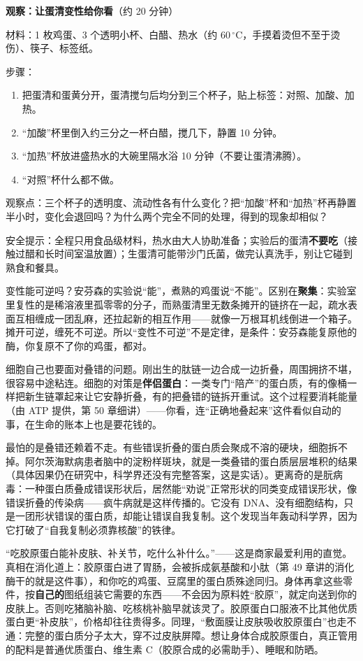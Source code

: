 \begin{shiyan}
\textbf{观察：让蛋清变性给你看}（约 20 分钟）

材料：1 枚鸡蛋、3 个透明小杯、白醋、热水（约 $60\,^{\circ}\mathrm{C}$，手摸着烫但不至于烫伤）、筷子、标签纸。

步骤：
\begin{enumerate}[itemsep=1pt]
\item 把蛋清和蛋黄分开，蛋清搅匀后均分到三个杯子，贴上标签：对照、加酸、加热。
\item “加酸”杯里倒入约三分之一杯白醋，搅几下，静置 10 分钟。
\item “加热”杯放进盛热水的大碗里隔水浴 10 分钟（不要让蛋清沸腾）。
\item “对照”杯什么都不做。
\end{enumerate}

观察点：三个杯子的透明度、流动性各有什么变化？把“加酸”杯和“加热”杯再静置半小时，变化会退回吗？为什么两个完全不同的处理，得到的现象却相似？

安全提示：全程只用食品级材料，热水由大人协助准备；实验后的蛋清\textbf{不要吃}（接触过醋和长时间室温放置）；生蛋清可能带沙门氏菌，做完认真洗手，别让它碰到熟食和餐具。
\end{shiyan}

变性能可逆吗？安芬森的实验说“能”，煮熟的鸡蛋说“不能”。区别在\textbf{聚集}：实验室里复性的是稀溶液里孤零零的分子，而熟蛋清里无数条摊开的链挤在一起，疏水表面互相缠成一团乱麻，还拉起新的相互作用——就像一万根耳机线倒进一个箱子。摊开可逆，缠死不可逆。所以“变性不可逆”不是定律，是条件：安芬森能复原他的酶，你复原不了你的鸡蛋，都对。

细胞自己也要面对叠错的问题。刚出生的肽链一边合成一边折叠，周围拥挤不堪，很容易中途粘连。细胞的对策是\textbf{伴侣蛋白}：一类专门“陪产”的蛋白质，有的像桶一样把新生链罩起来让它安静折叠，有的把叠错的链拆开重试。这个过程要消耗能量（由 ATP 提供，第 50 章细讲）——你看，连“正确地叠起来”这件看似自动的事，在生命的账本上也是要花钱的。

最怕的是叠错还赖着不走。有些错误折叠的蛋白质会聚成不溶的硬块，细胞拆不掉。阿尔茨海默病患者脑中的淀粉样斑块，就是一类叠错的蛋白质层层堆积的结果（具体因果仍在研究中，科学界还没有完整答案，这是实话）。更离奇的是朊病毒：一种蛋白质叠成错误形状后，居然能“劝说”正常形状的同类变成错误形状，像错误折叠的传染病——疯牛病就是这样传播的。它没有 DNA、没有细胞结构，只是一团形状错误的蛋白质，却能让错误自我复制。这个发现当年轰动科学界，因为它打破了“自我复制必须靠核酸”的铁律。

\begin{wuqu}
“吃胶原蛋白能补皮肤、补关节，吃什么补什么。”——这是商家最爱利用的直觉。真相在消化道上：胶原蛋白进了胃肠，会被拆成氨基酸和小肽（第 49 章讲的消化酶干的就是这件事），和你吃的鸡蛋、豆腐里的蛋白质殊途同归。身体再拿这些零件，按\textbf{自己的}图纸组装它需要的东西——不会因为原料姓“胶原”，就定向送到你的皮肤上。否则吃猪脑补脑、吃核桃补脑早就该灵了。胶原蛋白口服液不比其他优质蛋白更“补皮肤”，价格却往往贵得多。同理，“敷面膜让皮肤吸收胶原蛋白”也走不通：完整的蛋白质分子太大，穿不过皮肤屏障。想让身体合成胶原蛋白，真正管用的配料是普通优质蛋白、维生素 C（胶原合成的必需助手）、睡眠和防晒。
\end{wuqu}


